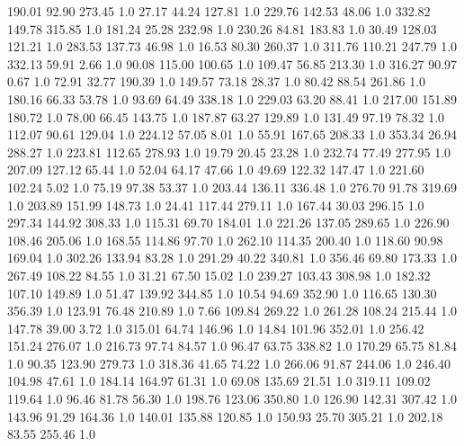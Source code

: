   190.01    92.90   273.45  1.0
   27.17    44.24   127.81  1.0
  229.76   142.53    48.06  1.0
  332.82   149.78   315.85  1.0
  181.24    25.28   232.98  1.0
  230.26    84.81   183.83  1.0
   30.49   128.03   121.21  1.0
  283.53   137.73    46.98  1.0
   16.53    80.30   260.37  1.0
  311.76   110.21   247.79  1.0
  332.13    59.91     2.66  1.0
   90.08   115.00   100.65  1.0
  109.47    56.85   213.30  1.0
  316.27    90.97     0.67  1.0
   72.91    32.77   190.39  1.0
  149.57    73.18    28.37  1.0
   80.42    88.54   261.86  1.0
  180.16    66.33    53.78  1.0
   93.69    64.49   338.18  1.0
  229.03    63.20    88.41  1.0
  217.00   151.89   180.72  1.0
   78.00    66.45   143.75  1.0
  187.87    63.27   129.89  1.0
  131.49    97.19    78.32  1.0
  112.07    90.61   129.04  1.0
  224.12    57.05     8.01  1.0
   55.91   167.65   208.33  1.0
  353.34    26.94   288.27  1.0
  223.81   112.65   278.93  1.0
   19.79    20.45    23.28  1.0
  232.74    77.49   277.95  1.0
  207.09   127.12    65.44  1.0
   52.04    64.17    47.66  1.0
   49.69   122.32   147.47  1.0
  221.60   102.24     5.02  1.0
   75.19    97.38    53.37  1.0
  203.44   136.11   336.48  1.0
  276.70    91.78   319.69  1.0
  203.89   151.99   148.73  1.0
   24.41   117.44   279.11  1.0
  167.44    30.03   296.15  1.0
  297.34   144.92   308.33  1.0
  115.31    69.70   184.01  1.0
  221.26   137.05   289.65  1.0
  226.90   108.46   205.06  1.0
  168.55   114.86    97.70  1.0
  262.10   114.35   200.40  1.0
  118.60    90.98   169.04  1.0
  302.26   133.94    83.28  1.0
  291.29    40.22   340.81  1.0
  356.46    69.80   173.33  1.0
  267.49   108.22    84.55  1.0
   31.21    67.50    15.02  1.0
  239.27   103.43   308.98  1.0
  182.32   107.10   149.89  1.0
   51.47   139.92   344.85  1.0
   10.54    94.69   352.90  1.0
  116.65   130.30   356.39  1.0
  123.91    76.48   210.89  1.0
    7.66   109.84   269.22  1.0
  261.28   108.24   215.44  1.0
  147.78    39.00     3.72  1.0
  315.01    64.74   146.96  1.0
   14.84   101.96   352.01  1.0
  256.42   151.24   276.07  1.0
  216.73    97.74    84.57  1.0
   96.47    63.75   338.82  1.0
  170.29    65.75    81.84  1.0
   90.35   123.90   279.73  1.0
  318.36    41.65    74.22  1.0
  266.06    91.87   244.06  1.0
  246.40   104.98    47.61  1.0
  184.14   164.97    61.31  1.0
   69.08   135.69    21.51  1.0
  319.11   109.02   119.64  1.0
   96.46    81.78    56.30  1.0
  198.76   123.06   350.80  1.0
  126.90   142.31   307.42  1.0
  143.96    91.29   164.36  1.0
  140.01   135.88   120.85  1.0
  150.93    25.70   305.21  1.0
  202.18    83.55   255.46  1.0
